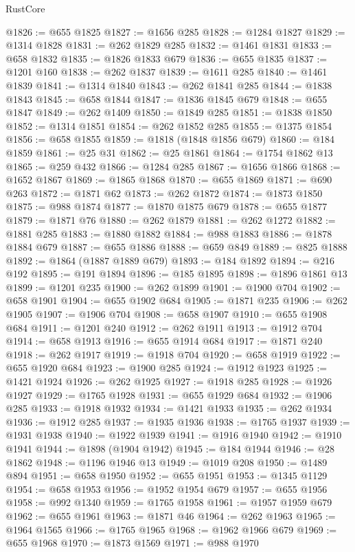\begin{lexlean}{RustCore}
\begin{coremodule}
@1826 := @655 @1825
@1827 := @1656 @285
@1828 := @1284 @1827
@1829 := @1314 @1828
@1831 := @262 @1829 @285
@1832 := @1461 @1831
@1833 := @658 @1832
@1835 := @1826 @1833 @679
@1836 := @655 @1835
@1837 := @1201 @160
@1838 := @262 @1837
@1839 := @1611 @285
@1840 := @1461 @1839
@1841 := @1314 @1840
@1843 := @262 @1841 @285
@1844 := @1838 @1843
@1845 := @658 @1844
@1847 := @1836 @1845 @679
@1848 := @655 @1847
@1849 := @262 @1409
@1850 := @1849 @285
@1851 := @1838 @1850
@1852 := @1314 @1851
@1854 := @262 @1852 @285
@1855 := @1375 @1854
@1856 := @658 @1855
@1859 := @1818 (@1848 @1856 @679)
@1860 := @184 @1859
@1861 := @25 @31
@1862 := @25 @1861
@1864 := @1754 @1862 @13
@1865 := @259 @432
@1866 := @1284 @285
@1867 := @1656 @1866
@1868 := @1652 @1867
@1869 := @1865 @1868
@1870 := @655 @1869
@1871 := @690 @263
@1872 := @1871 @62
@1873 := @262 @1872
@1874 := @1873 @1850
@1875 := @988 @1874
@1877 := @1870 @1875 @679
@1878 := @655 @1877
@1879 := @1871 @76
@1880 := @262 @1879
@1881 := @262 @1272
@1882 := @1881 @285
@1883 := @1880 @1882
@1884 := @988 @1883
@1886 := @1878 @1884 @679
@1887 := @655 @1886
@1888 := @659 @849
@1889 := @825 @1888
@1892 := @1864 (@1887 @1889 @679)
@1893 := @184 @1892
@1894 := @216 @192
@1895 := @191 @1894
@1896 := @185 @1895
@1898 := @1896 @1861 @13
@1899 := @1201 @235
@1900 := @262 @1899
@1901 := @1900 @704
@1902 := @658 @1901
@1904 := @655 @1902 @684
@1905 := @1871 @235
@1906 := @262 @1905
@1907 := @1906 @704
@1908 := @658 @1907
@1910 := @655 @1908 @684
@1911 := @1201 @240
@1912 := @262 @1911
@1913 := @1912 @704
@1914 := @658 @1913
@1916 := @655 @1914 @684
@1917 := @1871 @240
@1918 := @262 @1917
@1919 := @1918 @704
@1920 := @658 @1919
@1922 := @655 @1920 @684
@1923 := @1900 @285
@1924 := @1912 @1923
@1925 := @1421 @1924
@1926 := @262 @1925
@1927 := @1918 @285
@1928 := @1926 @1927
@1929 := @1765 @1928
@1931 := @655 @1929 @684
@1932 := @1906 @285
@1933 := @1918 @1932
@1934 := @1421 @1933
@1935 := @262 @1934
@1936 := @1912 @285
@1937 := @1935 @1936
@1938 := @1765 @1937
@1939 := @1931 @1938
@1940 := @1922 @1939
@1941 := @1916 @1940
@1942 := @1910 @1941
@1944 := @1898 (@1904 @1942)
@1945 := @184 @1944
@1946 := @28 @1862
@1948 := @1196 @1946 @13
@1949 := @1019 @208
@1950 := @1489 @894
@1951 := @658 @1950
@1952 := @655 @1951
@1953 := @1345 @1129
@1954 := @658 @1953
@1956 := @1952 @1954 @679
@1957 := @655 @1956
@1958 := @992 @1340
@1959 := @1765 @1958
@1961 := @1957 @1959 @679
@1962 := @655 @1961
@1963 := @1871 @46
@1964 := @262 @1963
@1965 := @1964 @1565
@1966 := @1765 @1965
@1968 := @1962 @1966 @679
@1969 := @655 @1968
@1970 := @1873 @1569
@1971 := @988 @1970

\end{coremodule}
\end{lexlean}
